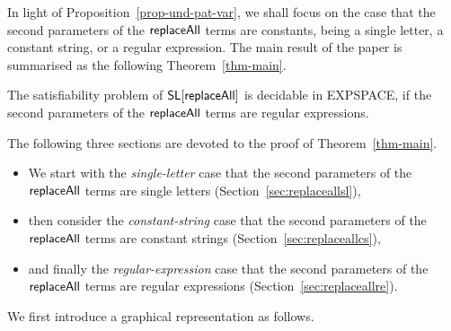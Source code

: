  

In light of Proposition~\ref{prop-und-pat-var}, we shall focus on the case that the second parameters of the $\mathsf{replaceAll}$ terms are constants, being a single letter, a constant string, or a regular expression. 
%
The main result of the paper is summarised as the following Theorem~\ref{thm-main}.

\begin{theorem}\label{thm-main}
	The satisfiability problem of $\mathsf{SL}[\mathsf{replaceAll}]$ is decidable in EXPSPACE, if the second parameters of the $\mathsf{replaceAll}$ terms are regular expressions.  
\end{theorem}

The following three sections are devoted to the proof of Theorem~\ref{thm-main}.  
\begin{itemize}
\item We start with the \emph{single-letter} case that the second parameters of the $\mathsf{replaceAll}$ terms are single letters (Section~\ref{sec:replaceallsl}),
\item then consider the \emph{constant-string} case that the second parameters of the $\mathsf{replaceAll}$ terms are constant strings  (Section~\ref{sec:replaceallcs}), \item and finally the \emph{regular-expression} case that the second parameters of the $\mathsf{replaceAll}$ terms are regular expressions  (Section~\ref{sec:replaceallre}).
\end{itemize}




We first introduce a graphical representation as follows.    

